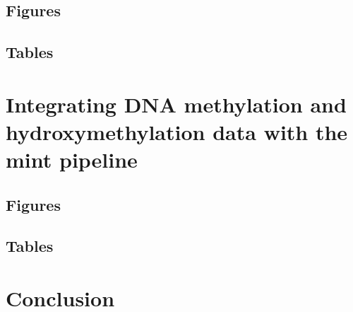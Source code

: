 \documentclass[leqno]{report}
\theoremstyle{plain}
\theoremstyle{definition}
\theoremstyle{remark}
\numberwithin{theorem}{chapter}        %
\begin{document}
\section*{Figures}

\clearpage
\section*{Tables}


\chapter{Integrating DNA methylation and hydroxymethylation data with the mint pipeline}
\label{chap5}

\clearpage
\section*{Figures}

\clearpage
\section*{Tables}


\chapter{Conclusion}
\label{conclusion}


%

\end{document}

